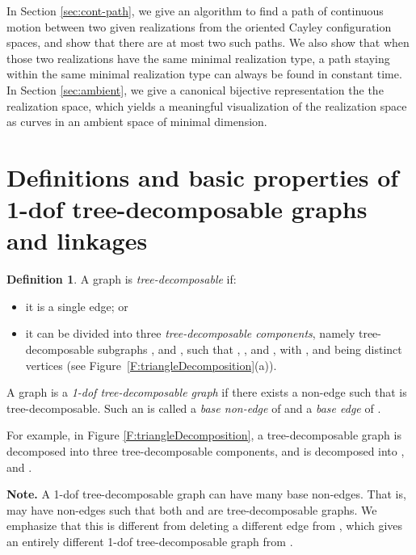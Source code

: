 \documentclass[secthm,amsthm,english]{article}
\theoremstyle{definition}
\newtheorem{definition}{Definition}
\theoremstyle{remark}
\begin{document}
In Section \ref{sec:cont-path}, 
we give an algorithm to find a path of continuous motion between two given realizations from the oriented Cayley configuration spaces, 
and show that there are at most two such paths.  
We also show that when those two realizations have the same minimal realization type, 
a path staying within the same minimal realization type can always be found in constant time. 
In Section \ref{sec:ambient}, we give a canonical bijective representation the the realization space, which yields a meaningful visualization of the realization space as curves in an ambient space of minimal dimension.


\section{Definitions and basic properties of 1-dof tree-decomposable graphs and linkages}
\label{sec:Basic-properties}

\begin{definition}
\label{def:t-decomp}
A graph  is {\emph{tree-decomposable}} if: 

\begin{itemize}
	\item it is a single edge; or 

	\item it can be divided into three {\emph{tree-decomposable components}}, namely tree-decomposable subgraphs ,
	 and , such that , ,
	 and ,
	with ,  and  being distinct vertices
	(see Figure~\ref{F:triangleDecomposition}(a)). 
\end{itemize}
A graph  is a {\emph{1-dof tree-decomposable graph}}
if there exists a non-edge  such that  is tree-decomposable.
Such an  is called a {\emph{base non-edge}}
of  and a {\emph{base edge}} of .
\end{definition}


 For example, in Figure \ref{F:triangleDecomposition}, a tree-decomposable graph is decomposed into three tree-decomposable components, and  is decomposed into ,  and .

\smallskip

\noindent\textbf{Note.}
A 1-dof tree-decomposable graph  can have many base non-edges. 
That is,  may have non-edges  such that both  and  are tree-decomposable graphs. 
We emphasize that this is different from deleting a different
edge  from , which  gives an entirely different 1-dof tree-decomposable graph from .  
\end{document}
